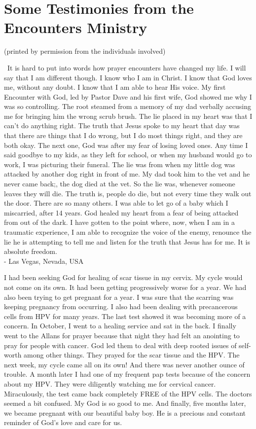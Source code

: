 \documentclass[oneside,12pt]{book}
\begin{document}
\chapter{Some Testimonies from the Encounters Ministry}

\small{(printed by permission from the individuals involved)}

\clearpage
\
It is hard to put into words how prayer encounters have changed my life. I will say that I am different though.  I know who I am in Christ. I know that God loves me, without any doubt.  I know that I am able to hear His voice.
My first Encounter with God, led by Pastor Dave and his first wife, God showed me why I was so controlling. The root steamed from a memory of my dad verbally accusing me for bringing him the wrong scrub brush. The lie placed in my heart was that I can't do anything right. The truth that Jesus spoke to my heart that day was that there are things that I do wrong, but I do most things right, and they are both okay.
The next one, God was after my fear of losing loved ones. Any time I said goodbye to my kids, as they left for school, or when my husband would go to work, I was picturing their funeral. The lie was from when my little dog was attacked by another dog right in front of me. My dad took him to the vet and he never came back;, the dog died at the vet. So the lie was, whenever someone leaves they will die. The truth is,  people do die, but not every time they walk out the door.
There are so many others.  I was able to let go of a baby which I miscarried, after 14 years.
God healed my heart from a fear of being attacked from out of the dark.
I have gotten to the point where, now, when I am in a traumatic experience,  I am able to recognize the voice of the enemy, renounce the lie he is attempting to tell me and listen for the truth that Jesus has for me. It is absolute  freedom. \\

- Las Vegas, Nevada, USA
\clearpage

I had been seeking God for healing of scar tissue in my cervix. My cycle would not come on its own. It had been getting progressively worse for a year. We had also been trying to get pregnant for a year. I was sure that the scarring was keeping pregnancy from occurring. I also had been dealing with precancerous cells from HPV for many years. The last test showed it was becoming more of a concern.
In October, I went to a healing service and sat in the back. I finally went to the Allans for prayer because that night they had felt an anointing to pray for people with cancer. God led them to deal with deep rooted issues of self-worth among other things. They prayed for the scar tissue and the HPV.
The next week, my cycle came all on its own! And there was never another ounce of trouble. A month later I had one of my frequent pap tests because of the concern about my HPV. They were diligently watching me for cervical cancer. Miraculously, the test came back  completely FREE of the HPV cells. The doctors seemed a bit confused. My God is so good to me.
And finally, five months later, we became pregnant with our beautiful baby boy. He is a precious and constant reminder of God's love and care for us. \\
\end{document}
